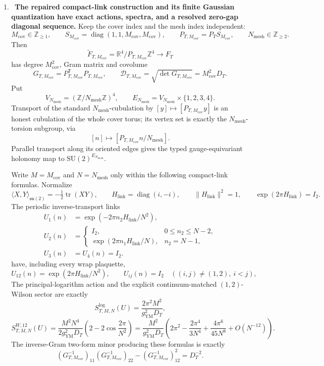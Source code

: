 \begin{enumerate}[leftmargin=1.8em,itemsep=.65em]
\item \Verified\ \textbf{The repaired compact-link construction and its
finite Gaussian quantization have exact actions, spectra, and a resolved
zero-gap diagonal sequence.}
Keep the cover index and the mesh index independent:
\[
 M_{\mathrm{cov}}\in\mathbb Z_{\ge1},\qquad
 S_{M_{\mathrm{cov}}}=\operatorname{diag}(1,1,M_{\mathrm{cov}},M_{\mathrm{cov}}),
 \qquad P_{T,M_{\mathrm{cov}}}=P_TS_{M_{\mathrm{cov}}},
 \qquad N_{\mathrm{mesh}}\in\mathbb Z_{\ge2}.
\]
Then
\[
 \widetilde F_{T,M_{\mathrm{cov}}}
 =\mathbb R^4/P_{T,M_{\mathrm{cov}}}\mathbb Z^4
 \longrightarrow F_T
\]
has degree \(M_{\mathrm{cov}}^2\), Gram matrix and covolume
\[
 G_{T,M_{\mathrm{cov}}}
 =P_{T,M_{\mathrm{cov}}}^{\mathsf T}P_{T,M_{\mathrm{cov}}},
 \qquad
 \mathcal D_{T,M_{\mathrm{cov}}}
 =\sqrt{\det G_{T,M_{\mathrm{cov}}}}
 =M_{\mathrm{cov}}^2D_T.
\]
Put
\[
 V_{N_{\mathrm{mesh}}}
 =(\mathbb Z/N_{\mathrm{mesh}}\mathbb Z)^4,
 \qquad
 E_{N_{\mathrm{mesh}}}
 =V_{N_{\mathrm{mesh}}}\times\{1,2,3,4\}.
\]
Transport of the standard
\(N_{\mathrm{mesh}}\)-cubulation by \([y]\mapsto[P_{T,M_{\mathrm{cov}}}y]\)
is an honest cubulation of the whole cover torus; its vertex set is exactly
the \(N_{\mathrm{mesh}}\)-torsion subgroup, via
\[
 [n]\longmapsto
 \left[P_{T,M_{\mathrm{cov}}}n/N_{\mathrm{mesh}}\right].
\]
Parallel transport along its oriented edges gives the typed gauge-equivariant
holonomy map to \(\mathrm{SU}(2)^{E_{N_{\mathrm{mesh}}}}\).

Write \(M=M_{\mathrm{cov}}\) and \(N=N_{\mathrm{mesh}}\) only within the
following compact-link formulas.  Normalize
\[
 \langle X,Y\rangle_{\mathfrak{su}(2)}
 =-\tfrac12\operatorname{tr}(XY),
 \qquad H_{\mathrm{link}}=\operatorname{diag}(i,-i),
 \qquad \lVert H_{\mathrm{link}}\rVert^2=1,
 \qquad \exp(2\pi H_{\mathrm{link}})=I_2.
\]
The periodic
inverse-transport links
\[
 \begin{aligned}
 U_1(n)&=\exp(-2\pi n_2H_{\mathrm{link}}/N^2),\\
 U_2(n)&=
 \begin{cases}I_2,&0\le n_2\le N-2,\\
 \exp(2\pi n_1H_{\mathrm{link}}/N),&n_2=N-1,\end{cases}\\
 U_3(n)&=U_4(n)=I_2.
 \end{aligned}
\]
have, including every wrap plaquette,
\[
 U_{12}(n)=\exp(2\pi H_{\mathrm{link}}/N^2),\qquad U_{ij}(n)=I_2
 \quad((i,j)\ne(1,2),\ i<j),
\]
The principal-logarithm action and the
explicit continuum-matched \((1,2)\)-Wilson sector are exactly
\[
 S^{\log}_{T,M,N}(U)=\frac{2\pi^2M^2}{g_{\mathrm{YM}}^2D_T},
\]
\[
 S^{W,12}_{T,M,N}(U)
 =\frac{M^2N^4}{2g_{\mathrm{YM}}^2D_T}
   \left(2-2\cos\frac{2\pi}{N^2}\right)
 =\frac{M^2}{g_{\mathrm{YM}}^2D_T}
  \left(2\pi^2-\frac{2\pi^4}{3N^4}
  +\frac{4\pi^6}{45N^8}+O(N^{-12})\right).
\]
The inverse-Gram two-form minor producing these formulas is exactly
\[
 (G_{T,M_{\mathrm{cov}}}^{-1})_{11}
 (G_{T,M_{\mathrm{cov}}}^{-1})_{22}
 -(G_{T,M_{\mathrm{cov}}}^{-1})_{12}^2=D_T^{-2}.
\]


\end{enumerate}
